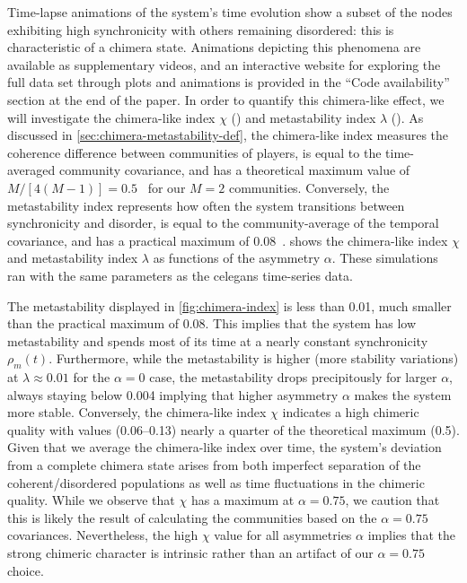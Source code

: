 \documentclass[pdflatex,lineno,referee,sn-nature]{sn-jnl}
\begin{document}
Time-lapse animations of the system's time evolution
show a subset of the nodes exhibiting high synchronicity
with others remaining disordered: this is characteristic of a chimera state.
Animations depicting this phenomena are available as supplementary videos,
and an interactive website for exploring the full data set
through plots and animations is provided in the ``Code availability''
section at the end of the paper.
In order to quantify this chimera-like effect, we will investigate
the chimera-like index $\chi$ ()
and metastability index $\lambda$ ().
As discussed in \cref{sec:chimera-metastability-def},
the chimera-like index
measures the coherence difference between communities of players,
is equal to the time-averaged community covariance,
and has a theoretical maximum value
of $M/[4(M-1)] = \num{0.5}$~\citep{shanahan2010metastable}
for our $M=2$ communities.
Conversely, the metastability index
represents how often the system transitions
between synchronicity and disorder,
is equal to the community-average of the temporal covariance,
and has a practical maximum of \num{0.08}~\citep{shanahan2010metastable}.
 shows the
 chimera-like index $\chi$
and
 metastability index $\lambda$
as functions of the asymmetry $\alpha$.
These simulations ran with the same parameters as the
\gls{celegans} time-series data.

The metastability displayed in \cref{fig:chimera-index}
is less than \num{0.01}, much smaller
than the practical maximum of \num{0.08}.
This implies that the system has low metastability
and spends most of its time at a nearly constant
synchronicity $\rho_m(t)$.
Furthermore, while the metastability is higher (more stability variations)
at $\lambda \approx \num{0.01}$ for the $\alpha = 0$ case,
the metastability drops precipitously for larger $\alpha$,
always staying below \num{0.004} implying that
higher asymmetry $\alpha$ makes the system more stable.
Conversely, the chimera-like index $\chi$
indicates a high chimeric quality
with values (\numrange{0.06}{0.13})
nearly a quarter of the theoretical maximum (\num{0.5}).
Given that we average the chimera-like index over time,
the system's deviation from a complete chimera state
arises from both imperfect separation of the coherent/disordered populations
as well as time fluctuations in the chimeric quality.
While we observe that $\chi$ has a maximum at $\alpha = \num{0.75}$,
we caution that this is likely the result of calculating the communities
based on the $\alpha = \num{0.75}$ covariances.
Nevertheless, the high $\chi$ value for all asymmetries $\alpha$
implies that the strong chimeric character is intrinsic
rather than an artifact of our $\alpha = \num{0.75}$ choice.
\end{document}
